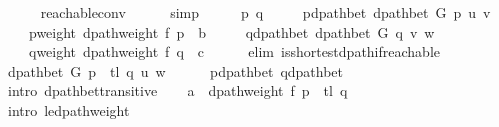 \begin{isabellebody}
\ \ \ \ \isamarkupfalse%
\ {\isasymdelta}{\isacharunderscore}{\kern0pt}reachable{\isacharunderscore}{\kern0pt}conv\isanewline
\ \ \ \ \isamarkupfalse%
\ simp{\isacharplus}{\kern0pt}\isanewline
\ \ \isamarkupfalse%
\ \isamarkupfalse%
\ p\ q\ \isanewline
\ \ \ \ p{\isacharunderscore}{\kern0pt}dpath{\isacharunderscore}{\kern0pt}bet{\isacharcolon}{\kern0pt}\ {\isachardoublequoteopen}dpath{\isacharunderscore}{\kern0pt}bet\ G\ p\ u\ v{\isachardoublequoteclose}\ \isanewline
\ \ \ \ p{\isacharunderscore}{\kern0pt}weight{\isacharcolon}{\kern0pt}\ {\isachardoublequoteopen}dpath{\isacharunderscore}{\kern0pt}weight\ f\ p\ {\isacharequal}{\kern0pt}\ {\isacharquery}{\kern0pt}b{\isachardoublequoteclose}\ \isanewline
\ \ \ \ q{\isacharunderscore}{\kern0pt}dpath{\isacharunderscore}{\kern0pt}bet{\isacharcolon}{\kern0pt}\ {\isachardoublequoteopen}dpath{\isacharunderscore}{\kern0pt}bet\ G\ q\ v\ w{\isachardoublequoteclose}\ \isanewline
\ \ \ \ q{\isacharunderscore}{\kern0pt}weight{\isacharcolon}{\kern0pt}\ {\isachardoublequoteopen}dpath{\isacharunderscore}{\kern0pt}weight\ f\ q\ {\isacharequal}{\kern0pt}\ {\isacharquery}{\kern0pt}c{\isachardoublequoteclose}\isanewline
\ \ \ \ \isamarkupfalse%
\ {\isacharparenleft}{\kern0pt}elim\ is{\isacharunderscore}{\kern0pt}shortest{\isacharunderscore}{\kern0pt}dpath{\isacharunderscore}{\kern0pt}if{\isacharunderscore}{\kern0pt}reachable{\isacharparenright}{\kern0pt}\isanewline
\isanewline
\ \ \isamarkupfalse%
\ {\isachardoublequoteopen}dpath{\isacharunderscore}{\kern0pt}bet\ G\ {\isacharparenleft}{\kern0pt}p\ {\isacharat}{\kern0pt}\ tl\ q{\isacharparenright}{\kern0pt}\ u\ w{\isachardoublequoteclose}\isanewline
\ \ \ \ \isamarkupfalse%
\ p{\isacharunderscore}{\kern0pt}dpath{\isacharunderscore}{\kern0pt}bet\ q{\isacharunderscore}{\kern0pt}dpath{\isacharunderscore}{\kern0pt}bet\isanewline
\ \ \ \ \isamarkupfalse%
\ {\isacharparenleft}{\kern0pt}intro\ dpath{\isacharunderscore}{\kern0pt}bet{\isacharunderscore}{\kern0pt}transitive{\isacharparenright}{\kern0pt}\isanewline
\ \ \isamarkupfalse%
\ {\isachardoublequoteopen}{\isacharquery}{\kern0pt}a\ {\isasymle}\ dpath{\isacharunderscore}{\kern0pt}weight\ f\ {\isacharparenleft}{\kern0pt}p\ {\isacharat}{\kern0pt}\ tl\ q{\isacharparenright}{\kern0pt}{\isachardoublequoteclose}\isanewline
\ \ \ \ \isamarkupfalse%
\ {\isacharparenleft}{\kern0pt}intro\ {\isasymdelta}{\isacharunderscore}{\kern0pt}le{\isacharunderscore}{\kern0pt}dpath{\isacharunderscore}{\kern0pt}weight{\isacharparenright}{\kern0pt}\isanewline

\end{isabellebody}
